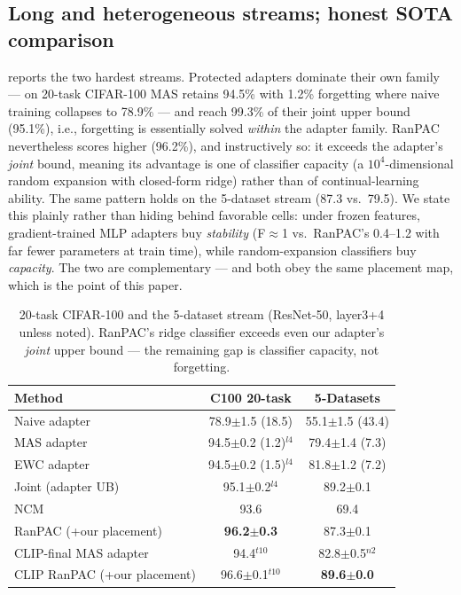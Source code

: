 \documentclass{article} %
\newcommand{\best}[1]{\textbf{#1}}
\begin{document}
\subsection{Long and heterogeneous streams; honest SOTA comparison}
\label{sec:honest}
 reports the two hardest streams. Protected adapters dominate
their own family --- on 20-task CIFAR-100 MAS retains 94.5\% with 1.2\%
forgetting where naive training collapses to 78.9\% --- and reach 99.3\% of
their joint upper bound (95.1\%), i.e., forgetting is essentially solved
\emph{within} the adapter family. RanPAC nevertheless scores higher (96.2\%),
and instructively so: it exceeds the adapter's \emph{joint} bound, meaning its
advantage is one of classifier capacity (a $10^4$-dimensional random expansion
with closed-form ridge) rather than of continual-learning ability. The same
pattern holds on the 5-dataset stream (87.3 vs.\ 79.5). We state this
plainly rather than hiding behind favorable cells: under frozen features,
gradient-trained MLP adapters buy \emph{stability} (F$\approx$1 vs.\
RanPAC's 0.4--1.2 with far fewer parameters at train time), while
random-expansion classifiers buy \emph{capacity}. The two are complementary
--- and both obey the same placement map, which is the point of this paper.
\begin{table}[t]
\centering\small
\caption{20-task CIFAR-100 and the 5-dataset stream (ResNet-50, layer3+4
unless noted). RanPAC's ridge classifier exceeds even our adapter's
\emph{joint} upper bound --- the remaining gap is classifier capacity, not
forgetting.}
\label{tab:long}
\begin{tabular}{lcc}
\toprule
Method & C100 20-task & 5-Datasets \\
\midrule
Naive adapter & 78.9$\pm$1.5 (18.5) & 55.1$\pm$1.5 (43.4) \\
MAS adapter & 94.5$\pm$0.2 (1.2)$^{l4}$ & 79.4$\pm$1.4 (7.3) \\
EWC adapter & 94.5$\pm$0.2 (1.5)$^{l4}$ & 81.8$\pm$1.2 (7.2) \\
Joint (adapter UB) & 95.1$\pm$0.2$^{l4}$ & 89.2$\pm$0.1 \\
NCM & 93.6 & 69.4 \\
RanPAC (+our placement) & \best{96.2$\pm$0.3} & 87.3$\pm$0.1 \\
\midrule
CLIP-final MAS adapter & 94.4$^{t10}$ & 82.8$\pm$0.5$^{n2}$ \\
CLIP RanPAC (+our placement) & 96.6$\pm$0.1$^{t10}$ & \best{89.6$\pm$0.0} \\
\bottomrule
\end{tabular}
\end{table}
\end{document}
